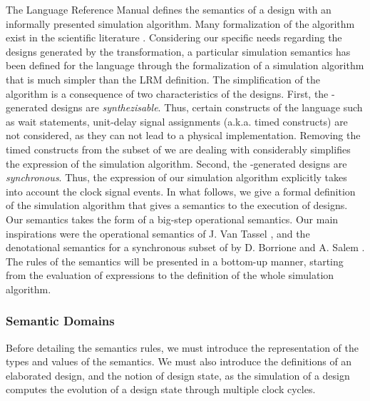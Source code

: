 \documentclass[pdflatex,sn-mathphys]{sn-jnl}%
\theoremstyle{thmstyleone}%
\theoremstyle{thmstyletwo}%
\theoremstyle{thmstylethree}%
\begin{document}
The \vhdl{} Language Reference Manual \cite{VHDL2000} defines the
semantics of a \vhdl{} design with an informally presented simulation
algorithm.  Many formalization of the algorithm exist in the
scientific
literature \cite{Borger1995,Borrione1995,Breuer1994,Breuer1995,Breuer1995a,Deharbe1995,Dohmen1995,Fuchs1995,Goossens1995,Kloos2012,Olcoz1995,Pandey1999,Reetz1995,Shankar1997,Thirunarayan2001,VanTassel1995}. Considering
our specific needs regarding the \vhdl{} designs generated by the
\hilecop{} transformation, a particular simulation semantics has been
defined for the \hvhdl{} language through the formalization of a
simulation algorithm that is much simpler than the LRM definition.
The simplification of the algorithm is a consequence of two
characteristics of the \hvhdl{} designs. First, the
\hilecop{}-generated \hvhdl{} designs are
\textit{synthezisable}. Thus, certain constructs of the \vhdl{}
language such as wait statements, unit-delay signal assignments
(a.k.a. timed constructs) are not considered, as they can not lead to
a physical implementation. Removing the timed constructs from the
subset of \vhdl{} we are dealing with considerably simplifies the
expression of the simulation algorithm. Second, the
\hilecop{}-generated \hvhdl{} designs are \textit{synchronous}. Thus,
the expression of our simulation algorithm explicitly takes into
account the clock signal events. In what follows, we give a formal
definition of the simulation algorithm that gives a semantics to the
execution of \hvhdl{} designs. Our semantics takes the form of a
big-step operational semantics. Our main inspirations were the
operational semantics of J. Van Tassel \cite{VanTassel1995}, and the
denotational semantics for a synchronous subset of \vhdl{} by
D. Borrione and A. Salem \cite{Borrione1995}. The rules of the
semantics will be presented in a bottom-up manner, starting from the
evaluation of expressions to the definition of the whole simulation
algorithm.

\subsubsection{Semantic Domains}
\label{subsubsec:sem-domains}

Before detailing the semantics rules, we must introduce the
representation of the types and values of the semantics. We must also
introduce the definitions of an elaborated design, and the notion of
design state, as the simulation of a design computes the evolution of
a design state through multiple clock cycles.
\end{document}
